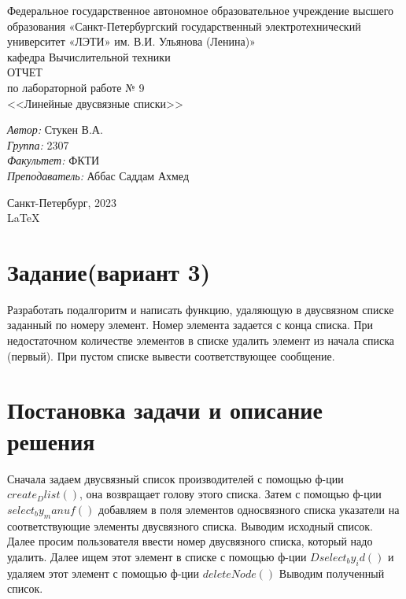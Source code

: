 \documentclass[a4paper,12pt]{report}
\begin{document}
 

\begin{titlepage} 

\begin{center} 

\large Федеральное государственное автономное образовательное учреждение высшего образования «Санкт-Петербургский государственный электротехнический университет «ЛЭТИ» им. В.И. Ульянова (Ленина)»\\
кафедра Вычислительной техники\\[5cm] 

\huge ОТЧЕТ\\ по лабораторной работе № 9\\[0.5cm] 
\large <<Линейные двусвязные списки>>\\[3.7cm]

\begin{minipage}{1\textwidth}
    \begin{flushleft}
        \emph{Автор:} Стукен В.А.\\
        \emph{Группа:} 2307\\
        \emph{Факультет:} ФКТИ\\
        \emph{Преподаватель:} Аббас Саддам Ахмед\\
    \end{flushleft}
\end{minipage}

\vfill

Санкт-Петербург, 2023\\
{\large \LaTeX}

\end{center}
\thispagestyle{empty}
\end{titlepage}

\section*{Задание(вариант 3)}
Разработать подалгоритм и написать функцию, удаляющую в двусвязном списке заданный по номеру элемент. Номер элемента задается с конца списка. При недостаточном количестве элементов в списке удалить элемент из начала списка (первый). При пустом списке вывести соответствующее сообщение.
\section*{Постановка задачи и описание решения}
\par

Сначала задаем двусвязный список производителей с помощью ф-ции $create_Dlist()$, она возвращает голову этого списка.
Затем с помощью ф-ции $select_by_manuf()$ добавляем в поля элементов односвязного списка указатели на соответствующие элементы двусвязного списка.
Выводим исходный список. 
Далее просим пользователя ввести номер двусвязного списка, который надо удалить. Далее ищем этот элемент в списке с помощью ф-ции $Dselect_by_id()$ и удаляем этот элемент с помощью ф-ции $deleteNode()$
Выводим полученный список.
\end{document}
